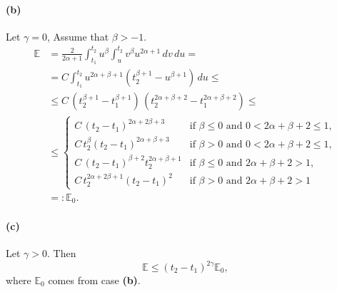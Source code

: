 \documentclass{article}
\theoremstyle{plain}
\theoremstyle{remark}
\theoremstyle{definition}
\begin{document}
\paragraph{(b)}
Let $\gamma=0$,
Assume that $\beta>-1$.
\begin{align*}
	\mathbb{E}
	&=
	\frac{2}{2\alpha+1}
	\int_{t_1}^{t_2} u^\beta
	\int_u^{t_2} v^\beta u^{2\alpha+1} \, dv \, du
	= \\ &=
	C \int_{t_1}^{t_2} u^{2\alpha+\beta+1}
	(t_2^{\beta+1} - u^{\beta+1}) \, du
	\le \\ &\le
	C \, (t_2^{\beta+1} -  t_1^{\beta+1}) \,
	(t_2^{2\alpha+\beta+2} - t_1^{2\alpha+\beta+2})
	\le \\ &\le
	\begin{cases}
		C \, (t_2-t_1)^{2\alpha+2\beta+3}
		& \mbox{if $\beta\mathbin{\le}0$ and
		$0\mathbin{<}2\alpha+\beta+2\mathbin{\le}1$},
		\\
		C \, t_2^\beta (t_2-t_1)^{2\alpha+\beta+3}
		& \mbox{if $\beta\mathbin{>}0$ and
		$0\mathbin{<}2\alpha+\beta+2\mathbin{\le}1$},
		\\
		C \, (t_2-t_1)^{\beta+2} t_2^{2\alpha+\beta+1}
		& \mbox{if $\beta\mathbin{\le}0$ and
		$2\alpha+\beta+2\mathbin{>}1$},
		\\
		C \, t_2^{2\alpha+2\beta+1} (t_2-t_1)^2
		& \mbox{if $\beta\mathbin{>}0$ and
		$2\alpha+\beta+2\mathbin{>}1$}
	\end{cases}
	\\ &=: \mathbb{E}_0.
\end{align*}
\paragraph{(c)}
Let $\gamma>0$.
Then
\[
	\mathbb{E} \le (t_2-t_1)^{2\gamma} \mathbb{E}_0,
\]
where $\mathbb{E}_0$ comes from case \textbf{(b)}.
\end{document}

